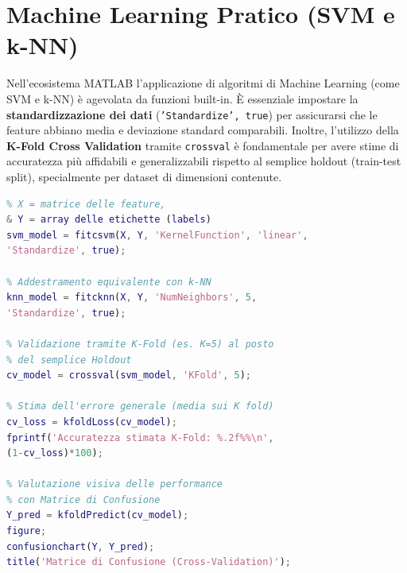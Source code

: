 \section{Machine Learning Pratico (SVM e k-NN)}
Nell'ecosistema MATLAB l'applicazione di algoritmi di Machine Learning (come SVM e k-NN) è agevolata da funzioni built-in.
È essenziale impostare la \textbf{standardizzazione dei dati} (\texttt{'Standardize', true}) per assicurarsi che le feature abbiano media e deviazione standard comparabili.
Inoltre, l'utilizzo della \textbf{K-Fold Cross Validation} tramite \texttt{crossval} è fondamentale per avere stime di accuratezza più affidabili e
generalizzabili rispetto al semplice holdout (train-test split), specialmente per dataset di dimensioni contenute.

\begin{lstlisting}[language=Matlab, frame=single, commentstyle=\color{green!50!black}, keywordstyle=\color{blue}]
% Addestramento di una Support Vector Machine
% X = matrice delle feature,
& Y = array delle etichette (labels)
svm_model = fitcsvm(X, Y, 'KernelFunction', 'linear',
'Standardize', true);

% Addestramento equivalente con k-NN
knn_model = fitcknn(X, Y, 'NumNeighbors', 5,
'Standardize', true);

% Validazione tramite K-Fold (es. K=5) al posto
% del semplice Holdout
cv_model = crossval(svm_model, 'KFold', 5);

% Stima dell'errore generale (media sui K fold)
cv_loss = kfoldLoss(cv_model);
fprintf('Accuratezza stimata K-Fold: %.2f%%\n',
(1-cv_loss)*100);

% Valutazione visiva delle performance
% con Matrice di Confusione
Y_pred = kfoldPredict(cv_model);
figure;
confusionchart(Y, Y_pred);
title('Matrice di Confusione (Cross-Validation)');
\end{lstlisting}
